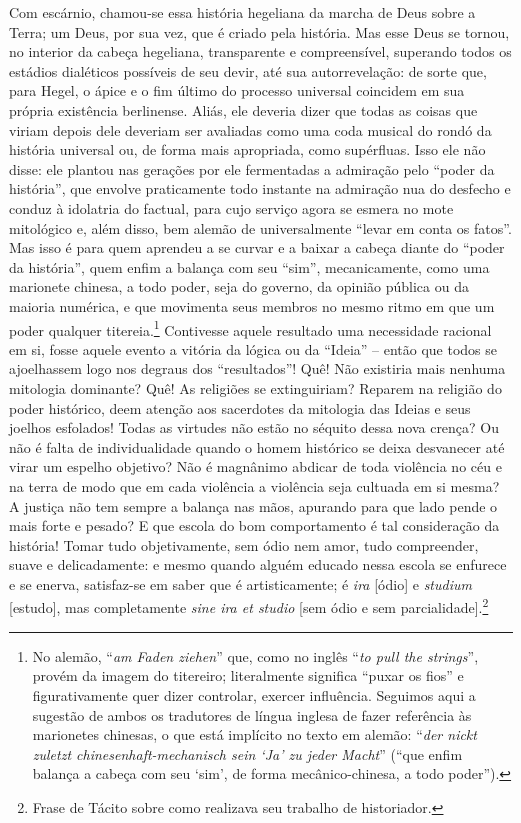 Com escárnio, chamou-se essa história hegeliana da marcha de Deus sobre
a Terra; um Deus, por sua vez, que é criado pela história. Mas esse Deus
se tornou, no interior da cabeça hegeliana, transparente e
compreensível, superando todos os estádios dialéticos possíveis de seu
devir, até sua autorrevelação: de sorte que, para Hegel, o ápice e o fim
último do processo universal coincidem em sua própria existência
berlinense. \label{existenciaberlinense} Aliás, ele deveria dizer que todas as coisas que viriam
depois dele deveriam ser avaliadas como uma coda musical do rondó da
história universal ou, de forma mais apropriada, como supérfluas. Isso
ele não disse: ele plantou nas gerações por ele fermentadas a admiração
pelo ``poder da história'', que envolve praticamente todo instante na
admiração nua do desfecho e conduz à idolatria do factual, para cujo
serviço agora se esmera no mote mitológico e, além disso, bem alemão de
universalmente ``levar em conta os fatos''. Mas isso é para quem
aprendeu a se curvar e a baixar a cabeça diante do ``poder da
história'', quem enfim a balança com seu ``sim'', mecanicamente, como
uma marionete chinesa, a todo poder, seja do governo, da opinião pública
ou da maioria numérica, e que movimenta seus membros no mesmo ritmo em
que um poder qualquer titereia.\footnote{No alemão, ``\emph{am Faden
  ziehen}'' que, como no inglês ``\emph{to pull the strings}'', provém
  da imagem do titereiro; literalmente significa ``puxar os fios'' e
  figurativamente quer dizer controlar, exercer influência. Seguimos
  aqui a sugestão de ambos os tradutores de língua inglesa de fazer
  referência às marionetes chinesas, o que está implícito no texto em
  alemão: ``\emph{der nickt zuletzt chinesenhaft-mechanisch sein `Ja' zu jeder
  Macht}'' (``que enfim balança a cabeça com seu `sim', de forma
  mecânico-chinesa, a todo poder'').} Contivesse aquele resultado uma
necessidade racional em si, fosse aquele evento a vitória da lógica ou
da ``Ideia'' -- então que todos se ajoelhassem logo nos degraus dos
``resultados''! Quê! Não existiria mais nenhuma mitologia dominante?
Quê! As religiões se extinguiriam? Reparem na religião do poder
histórico, deem atenção aos sacerdotes da mitologia das Ideias e seus
joelhos esfolados! Todas as virtudes não estão no séquito dessa nova
crença? Ou não é falta de individualidade quando o homem histórico se
deixa desvanecer até virar um espelho objetivo? Não é magnânimo abdicar
de toda violência no céu e na terra de modo que em cada violência a
violência seja cultuada em si mesma? A justiça não tem sempre a balança
nas mãos, apurando para que lado pende o mais forte e pesado? E que
escola do bom comportamento é tal consideração da história! Tomar tudo
objetivamente, sem ódio nem amor, tudo compreender, suave e
delicadamente: e mesmo quando alguém educado nessa escola se enfurece e
se enerva, satisfaz-se em saber que é artisticamente; é \emph{ira}
{[}ódio{]} e \emph{studium} {[}estudo{]}, mas completamente \emph{sine
ira et studio} {[}sem ódio e sem parcialidade{]}.\footnote{Frase de
  Tácito sobre como realizava seu trabalho de historiador.}

